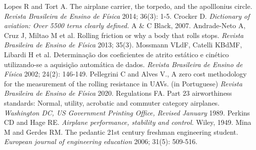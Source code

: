 \documentclass[10pt]{SelfArx} %
\begin{document}
\begin{thebibliography}{99}
 Lopes R and Tort A. The airplane carrier, the torpedo, and the apolllonius circle. \textit{Revista Brasileira de Ensino de Física} 2014; 36(3): 1-5.
 Crocker D. \textit{Dictionary of aviation: Over 5500 terns clearly defined.} A \& C Black, 2007.
 Andrade-Neto A, Cruz J, Miltao M et al. Rolling friction or why a body that rolls stops. \textit{Revista Brasileira de Ensino de Física} 2013; 35(3).
 Mossmann VLdF, Catelli KBdMF, Libardi H et al. Determinação dos coeficientes de atrito estático e cinético utilizando-se a aquisição automática de dados. \textit{Revista Brasileira de Ensino de Física} 2002; 24(2): 146-149.
 Pellegrini C and Alves V., A zero cost methodology for the measurement of the rolling resistance in UAVs. (in Portuguese) \textit{Revista Brasileira de Ensino de Física} 2020.
 Regulations FA. Part 23 airworthiness standards: Normal, utility, acrobatic and commuter category airplanes. \textit{Washington DC, US Government Printing Office, Revised January} 1989.
 Perkins CD and Hage RE. \textit{Airplane performance, stability and control.} Wiley, 1949.
 Mina M and Gerdes RM. The pedantic 21st century freshman engineering student. \textit{European journal of engineering education} 2006; 31(5): 509-516.
\end{thebibliography}
\end{document}
